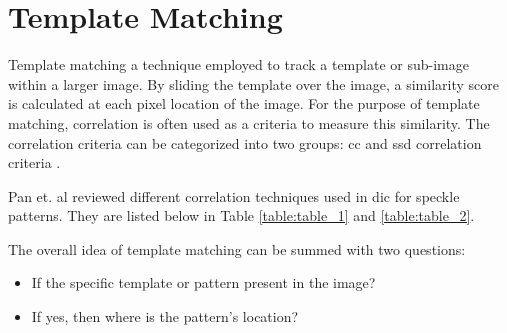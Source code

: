 



    \section{Template Matching}\label{section:template_matching}
    Template matching a technique employed to track a template or sub-image within a larger image. By sliding the template over the image, a similarity score is calculated at each pixel location of the image. For the purpose of template matching, correlation is often used as a criteria to measure this similarity. The correlation criteria can be categorized into two groups: \gls{cc} and \gls{ssd} correlation criteria \cite{pan_review}.
    
    Pan et. al reviewed different correlation techniques used in \gls{dic} for speckle patterns. They are listed below in Table \ref{table:table_1} and \ref{table:table_2}. 


    

    The overall idea of template matching can be summed with two questions:
    
    \begin{itemize}
        \item If the specific template or pattern present in the image?
        \item If yes, then where is the pattern's location?
    \end{itemize}

